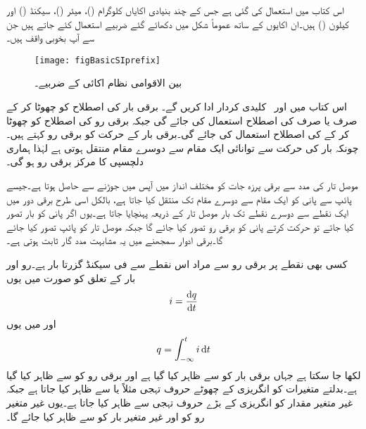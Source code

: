 اس کتاب میں  استعمال کی گئی ہے جس کے چند بنیادی اکایاں کلوگرام ()، میٹر ()، سیکنڈ () اور کیلون () ہیں۔ان اکایوں کے ساتھ عموماً شکل  میں دکھائے گئے ضربیے استعمال کئے جاتے ہیں جن سے آپ بخوبی واقف ہیں۔
\begin{figure}
\centering
\texttt{[image: figBasicSIprefix]}
\caption{بین الاقوامی نظام اکائی کے ضربیے۔}
\label{شکل_بنیادی_سابقہ}
\end{figure}

اس کتاب میں   اور
   \,  کلیدی کردار ادا کریں گے۔ برقی بار کی اصطلاح کو چھوٹا کر کے صرف  یا صرف  کی اصطلاح استعمال کی جائے گی جبکہ برقی رو کی اصطلاح کو چھوٹا کر کے  کی اصطلاح استعمال کی جائے گی۔برقی بار کے حرکت کو برقی رو کہتے ہیں۔چونکہ بار کی حرکت سے توانائی ایک مقام سے دوسرے مقام منتقل ہوتی ہے لہٰذا ہماری دلچسپی کا مرکز برقی رو ہو گی۔

موصل تار  کی مدد سے برقی پرزہ جات کو مختلف انداز میں آپس میں جوڑنے سے  حاصل ہوتا ہے۔جیسے پائپ سے پانی کو ایک مقام سے دوسرے مقام تک منتقل کیا جاتا ہے، بالکل اسی طرح برقی دور میں ایک نقطے سے دوسرے نقطے تک بار موصل تار کے ذریعہ پہنچایا جاتا ہے۔یوں اگر پانی کو بار تصور کیا جائے تو حرکت کرتے پانی کو برقی رو تصور کیا جائے گا جبکہ موصل تار کو پائپ تصور کیا جائے گا۔برقی ادوار سمجھنے میں یہ مشابہت مدد گار ثابت ہوتی ہے۔  

کسی بھی نقطے پر برقی رو سے مراد اس نقطے سے فی سیکنڈ گزرتا بار  ہے۔رو اور بار کے تعلق کو  صورت میں یوں
\begin{align}\label{مساوات_بنیادی_رو_تعریف}
i=\frac{\dif q}{\dif t}
\end{align}
اور  میں یوں
\begin{align}
q=\int_{-\infty}^{t} i \dif t
\end{align}
لکھا جا سکتا ہے جہاں برقی بار کو  سے ظاہر کیا گیا ہے اور برقی رو کو  سے ظاہر کیا گیا ہے۔بدلتے متغیرات کو انگریزی کے چھوٹے حروف تہجی  مثلاً  یا  سے ظاہر کیا جاتا ہے جبکہ غیر متغیر مقدار کو انگریزی کے بڑے حروف تہجی سے ظاہر کیا جاتا ہے۔یوں غیر متغیر رو کو  اور غیر متغیر بار کو  سے ظاہر کیا جائے گا۔

